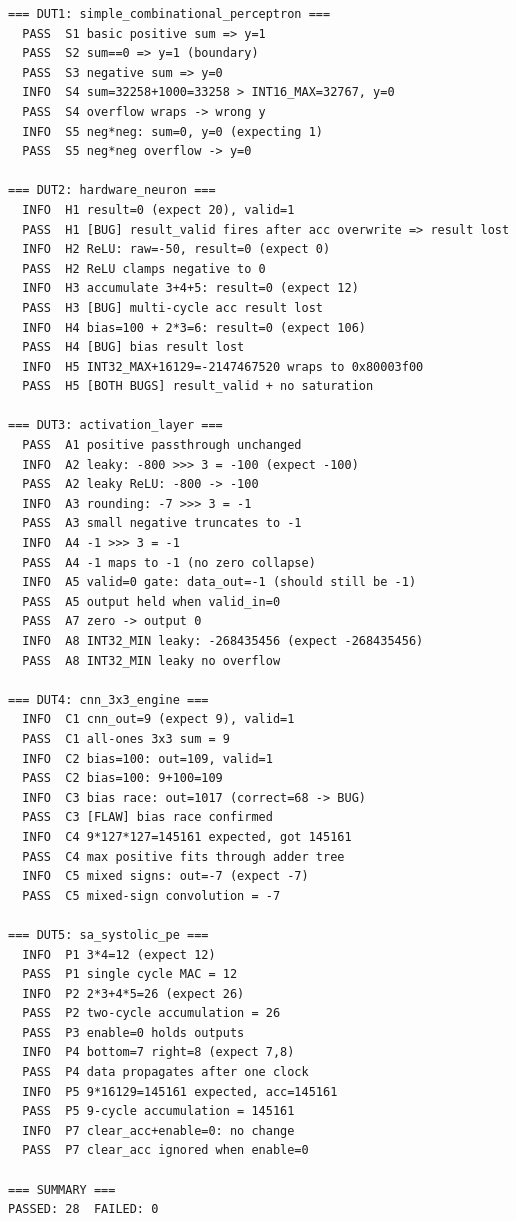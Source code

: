 \documentclass[12pt,a4paper]{article}
\begin{document}
\begin{verbatim}
=== DUT1: simple_combinational_perceptron ===
  PASS  S1 basic positive sum => y=1
  PASS  S2 sum==0 => y=1 (boundary)
  PASS  S3 negative sum => y=0
  INFO  S4 sum=32258+1000=33258 > INT16_MAX=32767, y=0
  PASS  S4 overflow wraps -> wrong y
  INFO  S5 neg*neg: sum=0, y=0 (expecting 1)
  PASS  S5 neg*neg overflow -> y=0

=== DUT2: hardware_neuron ===
  INFO  H1 result=0 (expect 20), valid=1
  PASS  H1 [BUG] result_valid fires after acc overwrite => result lost
  INFO  H2 ReLU: raw=-50, result=0 (expect 0)
  PASS  H2 ReLU clamps negative to 0
  INFO  H3 accumulate 3+4+5: result=0 (expect 12)
  PASS  H3 [BUG] multi-cycle acc result lost
  INFO  H4 bias=100 + 2*3=6: result=0 (expect 106)
  PASS  H4 [BUG] bias result lost
  INFO  H5 INT32_MAX+16129=-2147467520 wraps to 0x80003f00
  PASS  H5 [BOTH BUGS] result_valid + no saturation

=== DUT3: activation_layer ===
  PASS  A1 positive passthrough unchanged
  INFO  A2 leaky: -800 >>> 3 = -100 (expect -100)
  PASS  A2 leaky ReLU: -800 -> -100
  INFO  A3 rounding: -7 >>> 3 = -1
  PASS  A3 small negative truncates to -1
  INFO  A4 -1 >>> 3 = -1
  PASS  A4 -1 maps to -1 (no zero collapse)
  INFO  A5 valid=0 gate: data_out=-1 (should still be -1)
  PASS  A5 output held when valid_in=0
  PASS  A7 zero -> output 0
  INFO  A8 INT32_MIN leaky: -268435456 (expect -268435456)
  PASS  A8 INT32_MIN leaky no overflow

=== DUT4: cnn_3x3_engine ===
  INFO  C1 cnn_out=9 (expect 9), valid=1
  PASS  C1 all-ones 3x3 sum = 9
  INFO  C2 bias=100: out=109, valid=1
  PASS  C2 bias=100: 9+100=109
  INFO  C3 bias race: out=1017 (correct=68 -> BUG)
  PASS  C3 [FLAW] bias race confirmed
  INFO  C4 9*127*127=145161 expected, got 145161
  PASS  C4 max positive fits through adder tree
  INFO  C5 mixed signs: out=-7 (expect -7)
  PASS  C5 mixed-sign convolution = -7

=== DUT5: sa_systolic_pe ===
  INFO  P1 3*4=12 (expect 12)
  PASS  P1 single cycle MAC = 12
  INFO  P2 2*3+4*5=26 (expect 26)
  PASS  P2 two-cycle accumulation = 26
  PASS  P3 enable=0 holds outputs
  INFO  P4 bottom=7 right=8 (expect 7,8)
  PASS  P4 data propagates after one clock
  INFO  P5 9*16129=145161 expected, acc=145161
  PASS  P5 9-cycle accumulation = 145161
  INFO  P7 clear_acc+enable=0: no change
  PASS  P7 clear_acc ignored when enable=0

=== SUMMARY ===
PASSED: 28  FAILED: 0
\end{verbatim}
\end{document}

